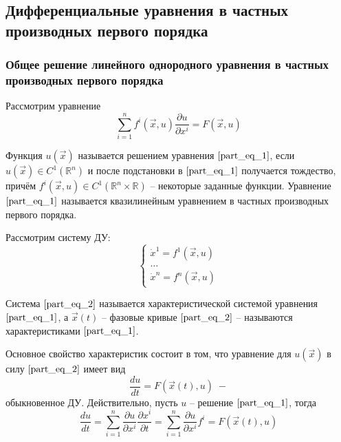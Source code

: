 \subsection{Дифференциальные уравнения в частных производных первого порядка}

\subsubsection{Общее решение линейного однородного уравнения в частных производных первого порядка}

\begin{definition}
	Рассмотрим уравнение
	\begin{equation}
		\sum \limits_{i = 1}^{n} f^{i} \left( \vec{x}, u \right) \frac{\partial u}{\partial x^{i}} = F \left( \vec{x}, u \right)
		\label{part_eq_1}
	\end{equation}
	
	Функция $u \left( \vec{x} \right)$ называется решением уравнения $\eqref{part_eq_1}$, если $u \left( \vec{x} \right) \in C^{1} \left( \mathbb{R}^n \right)$ и после подстановки в $\eqref{part_eq_1}$ получается тождество, причём $f^{i} \left( \vec{x}, u \right) \in C^{1} \left( \mathbb{R}^n \times \mathbb{R} \right)$ -- некоторые заданные функции. Уравнение $\eqref{part_eq_1}$ называется квазилинейным уравнением в частных производных первого порядка. 
\end{definition}

\begin{definition}
	Рассмотрим систему ДУ:
	\begin{equation}
		\begin{cases}
			\dot{x}^1 = f^1 \left( \vec{x}, u \right) \\
			\dots                                                \\
			\dot{x}^n = f^n \left( \vec{x}, u \right)
		\end{cases}
		\label{part_eq_2}
	\end{equation}
	
	Система $\eqref{part_eq_2}$ называется характеристической системой уравнения $\eqref{part_eq_1}$, а $\vec{x} \left( t \right) $ -- фазовые кривые $\eqref{part_eq_2}$ -- называются характеристиками $\eqref{part_eq_1}$.
\end{definition}

Основное свойство характеристик состоит в том, что уравнение для $u \left( \vec{x} \right) $ в силу $\eqref{part_eq_2}$ имеет вид 
\begin{equation*}
	\frac{du}{dt} = F \left( \vec{x} \left( t \right) , u \right) \; -
\end{equation*}
обыкновенное ДУ. Действительно, пусть $u$ -- решение $\eqref{part_eq_1}$, тогда 
\begin{equation*}
	\frac{du}{dt} = \sum \limits_{i = 1}^{n} \frac{\partial u}{\partial x^i} \frac{\partial x^i}{\partial t} = \sum \limits_{i = 1}^{n} \frac{\partial u}{\partial x^i} f^i = F \left( \vec{x} \left( t \right) , u \right) 
\end{equation*}

